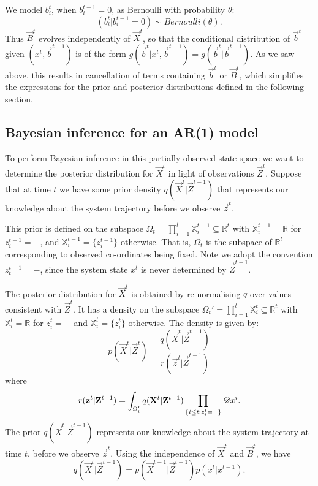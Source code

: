 We model $b_i^{t}$, when $b_i^{t-1} = 0$, as Bernoulli with probability $\theta$:
\begin{equation*}
    (b_i^{t} | b_i^{t-1} = 0) \sim Bernoulli(\theta).
\end{equation*}
Thus $\vec{B}^{t}$ evolves independently of $\vec{X}^{t}$, so that the conditional distribution of $\vec{b}^{t}$ given $(x^{t}, \vec{b}^{t-1})$ is of the form $g(\vec{b}^{t} | x^{t}, \vec{b}^{t-1} ) = g( \vec{b}^{t} | \vec{b}^{t-1} )$. As we saw above, this results in cancellation of terms containing $\vec{b}^{t}$ or $\vec{B}^{t}$, which simplifies the expressions for the prior and posterior distributions defined in the following section.

\subsection{Bayesian inference for an AR(1) model}
\label{sec:4}

To perform Bayesian inference in this partially observed state space we want to determine the posterior distribution for $\vec{X}^{t}$ in light of observations $\vec{Z}^{t}$. Suppose that at time $t$ we have some prior density $q(\vec{X}^{t} | \vec{Z}^{t-1})$ that represents our knowledge about the system trajectory before we observe $\vec{z}^{t}$. 

This prior is defined on the subspace $\Omega_t = \prod_{i=1}^t \mathbb{X}_i^{t-1} \subseteq \mathbb{R}^t$ with $\mathbb{X}_i^{t-1} = \mathbb{R}$ for $z_i^{t-1} = -$, and $\mathbb{X}_i^{t-1} = \{ z_i^{t-1} \}$ otherwise. That is, $\Omega_t$ is the subspace of $\mathbb{R}^t$ corresponding to observed co-ordinates being fixed. Note we adopt the convention $z_t^{t-1} = -$, since the system state $x^t$ is never determined by $\vec{Z}^{t-1}$. 

The posterior distribution for $\vec{X}^{t}$ is obtained by re-normalising $q$ over values consistent with $\vec{Z}^{t}$. It has a density on the subspace $\Omega_t' = \prod_{i=1}^t \mathbb{X}_i^{t} \subseteq \mathbb{R}^t$ with $\mathbb{X}_i^{t} = \mathbb{R}$ for $z_i^{t} = -$ and $\mathbb{X}_i^{t} = \{ z_i^{t}\}$ otherwise. The density is given by:
\begin{equation*}
    p(\vec{X}^{t} | \vec{Z}^{t}) = \frac{ q(\vec{X}^{t} |\vec{Z}^{t-1})} {r(\vec{z}^{t} | \vec{Z}^{t-1})}
\end{equation*}
where 
\begin{equation*}
    r(\mathbf{z}^{t} | \mathbf{Z}^{t-1}) = \int_{\Omega'_t} q(\mathbf{X}^{t} |\mathbf{Z}^{t-1}) \prod_{\{i \leq t: z_i^{t} = -\}} \mathscr{D} x^i.
\end{equation*}
The prior $q(\vec{X}^{t} | \vec{Z}^{t-1})$ represents our knowledge about the system trajectory at time $t$, before we observe $\vec{z}^{t}$. Using the independence of $\vec{X}^t$ and $\vec{B}^t$, we have
\begin{equation}
    q(\vec{X}^{t} | \vec{Z}^{t-1}) = p(\vec{X}^{t-1} | \vec{Z}^{t-1}) p(x^t | x^{t-1}).
    \label{eq:1}
\end{equation}

